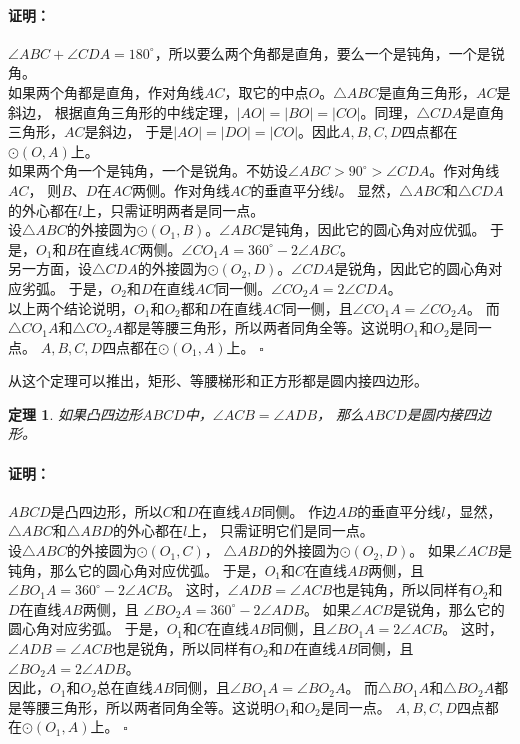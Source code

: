 \documentclass[12pt,UTF8]{ctexbook}
\newtheorem{tm}{定理}[section]
\renewenvironment{proof}{\paragraph{\textbf{证明：}}}{\hfill$\square$}
\begin{document}
\begin{proof}
    $\angle ABC + \angle CDA = 180^\circ$，所以要么两个角都是直角，要么一个是钝角，一个是锐角。\\
    如果两个角都是直角，作对角线$AC$，取它的中点$O$。$\triangle ABC$是直角三角形，$AC$是斜边，
    根据直角三角形的中线定理，$|AO| = |BO| = |CO|$。同理，$\triangle CDA$是直角三角形，$AC$是斜边，
    于是$|AO| = |DO| = |CO|$。因此$A,B,C,D$四点都在$\odot{(O, A)}$上。\\
    如果两个角一个是钝角，一个是锐角。不妨设$\angle ABC > 90^\circ > \angle CDA$。作对角线$AC$，
    则$B$、$D$在$AC$两侧。作对角线$AC$的垂直平分线$l$。
    显然，$\triangle ABC$和$\triangle CDA$的外心都在$l$上，只需证明两者是同一点。\\
    设$\triangle ABC$的外接圆为$\odot{(O_1, B)}$。$\angle ABC$是钝角，因此它的圆心角对应优弧。
    于是，$O_1$和$B$在直线$AC$两侧。$\angle CO_1A = 360^\circ - 2\angle ABC$。\\
    另一方面，设$\triangle CDA$的外接圆为$\odot{(O_2, D)}$。$\angle CDA$是锐角，因此它的圆心角对应劣弧。
    于是，$O_2$和$D$在直线$AC$同一侧。$\angle CO_2A = 2\angle CDA$。\\
    以上两个结论说明，$O_1$和$O_2$都和$D$在直线$AC$同一侧，且$\angle CO_1A = \angle CO_2A$。
    而$\triangle CO_1A$和$\triangle CO_2A$都是等腰三角形，所以两者同角全等。这说明$O_1$和$O_2$是同一点。
    $A,B,C,D$四点都在$\odot{(O_1, A)}$上。
\end{proof}

从这个定理可以推出，矩形、等腰梯形和正方形都是圆内接四边形。

\begin{tm}\label{tm:1-1-10}
    如果凸四边形$ABCD$中，$\angle ACB = \angle ADB$，
    那么$ABCD$是圆内接四边形。
\end{tm}

\begin{proof}
    $ABCD$是凸四边形，所以$C$和$D$在直线$AB$同侧。
    作边$AB$的垂直平分线$l$，显然，$\triangle ABC$和$\triangle ABD$的外心都在$l$上，
    只需证明它们是同一点。\\
    设$\triangle ABC$的外接圆为$\odot{(O_1, C)}$，
    $\triangle ABD$的外接圆为$\odot{(O_2, D)}$。
    如果$\angle ACB$是钝角，那么它的圆心角对应优弧。
    于是，$O_1$和$C$在直线$AB$两侧，且$\angle BO_1A = 360^\circ - 2\angle ACB$。
    这时，$\angle ADB = \angle ACB$也是钝角，所以同样有$O_2$和$D$在直线$AB$两侧，且
    $\angle BO_2A = 360^\circ - 2\angle ADB$。
    如果$\angle ACB$是锐角，那么它的圆心角对应劣弧。
    于是，$O_1$和$C$在直线$AB$同侧，且$\angle BO_1A = 2\angle ACB$。
    这时，$\angle ADB = \angle ACB$也是锐角，所以同样有$O_2$和$D$在直线$AB$同侧，且
    $\angle BO_2A = 2\angle ADB$。\\
    因此，$O_1$和$O_2$总在直线$AB$同侧，且$\angle BO_1A = \angle BO_2A$。
    而$\triangle BO_1A$和$\triangle BO_2A$都是等腰三角形，所以两者同角全等。这说明$O_1$和$O_2$是同一点。
    $A,B,C,D$四点都在$\odot{(O_1, A)}$上。
\end{proof}
\end{document}
